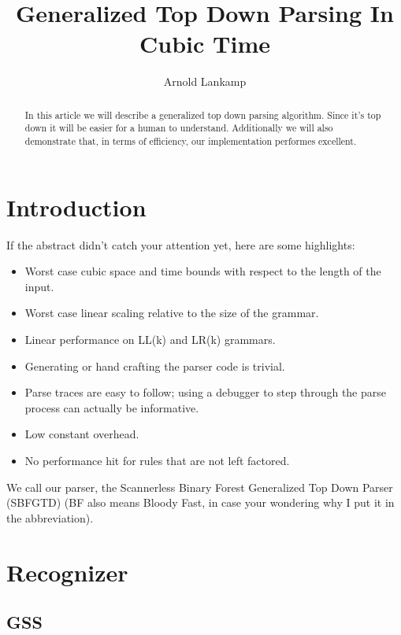 \documentclass[a4paper,10pt]{article}
\title{Generalized Top Down Parsing In Cubic Time}
\author{Arnold Lankamp}
\begin{document}
\maketitle

\begin{abstract}

In this article we will describe a generalized top down parsing algorithm. Since it's top down it will be easier for a human to understand. Additionally we will also demonstrate that, in terms of efficiency, our implementation performes excellent.

\end{abstract}

\section{Introduction}

If the abstract didn't catch your attention yet, here are some highlights:
\begin{itemize}
 \setlength{\itemsep}{0pt}
 \setlength{\parskip}{0pt}
 \setlength{\parsep}{0pt}

 \item Worst case cubic space and time bounds with respect to the length of the input.
 \item Worst case linear scaling relative to the size of the grammar.
 \item Linear performance on LL(k) and LR(k) grammars.
 \item Generating or hand crafting the parser code is trivial.
 \item Parse traces are easy to follow; using a debugger to step through the parse process can actually be informative.
 \item Low constant overhead.
 \item No performance hit for rules that are not left factored.
\end{itemize}
We call our parser, the Scannerless Binary Forest Generalized Top Down Parser (SBFGTD) (BF also means Bloody Fast, in case your wondering why I put it in the abbreviation).

\section{Recognizer}

\subsection{GSS}
\end{document}
